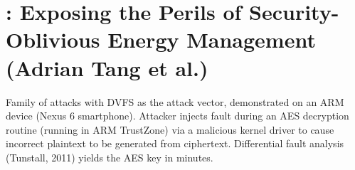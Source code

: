 \section{\clkscrew: Exposing the Perils of Security-Oblivious Energy Management
(Adrian Tang et al.)}

Family of attacks with DVFS as the attack vector, demonstrated on an ARM device
(Nexus 6 smartphone).
Attacker injects fault during an AES decryption routine (running in ARM
TrustZone) via a malicious kernel driver to cause incorrect plaintext to be
generated from ciphertext.
Differential fault analysis (Tunstall, 2011) yields the AES key in minutes.

